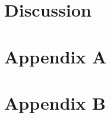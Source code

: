 \documentclass[a4paper, UKenglish]{book}
\begin{document}
\chapter{Discussion}\label{Chap:discussion}




\backmatter{}



\begin{appendices}

\appendix
\chapter{Appendix A}
\renewcommand{\thechapter}{A}
\renewcommand{\theequation}{\thechapter.\arabic{equation}}



\appendix
\renewcommand{\thechapter}{B}
\chapter{Appendix B}


%

%


\end{appendices}






\end{document}
